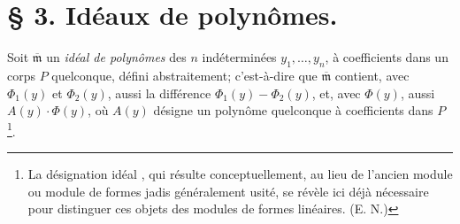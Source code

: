 \documentclass[11pt]{article}
\providecommand{\mideal}{\mathfrak m}
\begin{document}
\fi


\setcounter{footnote}{8}
\section*{\S{} 3. Idéaux de polynômes.}

Soit $\overline{\mideal}$ un \emph{idéal de polynômes} des $n$ indéterminées $y_1,\ldots,y_n$, à coefficients dans un corps $P$ quelconque, défini abstraitement; c'est-à-dire que $\overline{\mideal}$ contient, avec $\Phi_1(y)$ et $\Phi_2(y)$, aussi la différence $\Phi_1(y)-\Phi_2(y)$, et, avec $\Phi(y)$, aussi $A(y)\cdot\Phi(y)$, où $A(y)$ désigne un polynôme quelconque à coefficients dans $P$\footnote{La désignation \og idéal \fg{}, qui résulte conceptuellement, au lieu de l'ancien \og module \fg{} ou \og module de formes \fg{} jadis généralement usité, se révèle ici déjà nécessaire pour distinguer ces objets des modules de formes linéaires. (E. N.)}.
\end{document}
